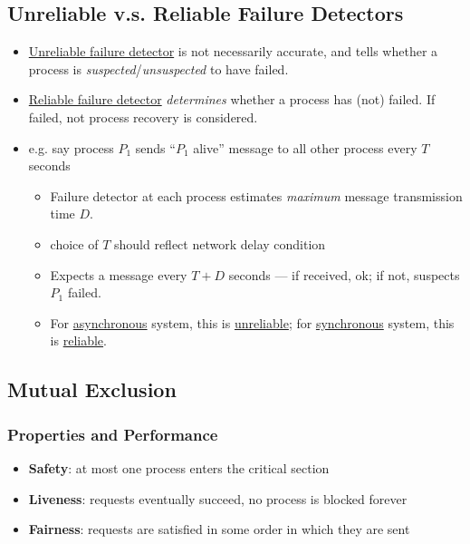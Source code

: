 \documentclass[twocolumn,landscape,10pt]{article}
\theoremstyle{definition}
\begin{document}
\subsection{Unreliable v.s. Reliable Failure Detectors}

\begin{itemize}
    \item \underline{Unreliable failure detector} is not necessarily accurate,
        and tells whether a process is \emph{suspected}/\emph{unsuspected} 
        to have failed.
    \item \underline{Reliable failure detector} \emph{determines} 
        whether a process has (not) failed.
        If failed, not process recovery is considered.
    \item e.g. say process $P_1$ sends ``$P_1$ alive'' message to all other
        process every $T$ seconds
        \begin{itemize}
            \item Failure detector at each process estimates \emph{maximum}
                message transmission time $D$.
            \item choice of $T$ should reflect network delay condition
            \item Expects a message every $T+D$ seconds --- if received, ok; if
                not, suspects $P_1$ failed.
            \item For \underline{asynchronous} system, this is
                \underline{unreliable}; for \underline{synchronous} system, this
                is \underline{reliable}.
        \end{itemize} 
\end{itemize} 

\subsection{Mutual Exclusion}

\subsubsection{Properties and Performance}


\begin{itemize}
    \item \textbf{Safety}: at most one process enters the critical section
    \item \textbf{Liveness}: requests eventually succeed, no process is blocked
        forever
    \item \textbf{Fairness}: requests are satisfied in some order in
        which they are sent
\end{itemize} 
\end{document}
